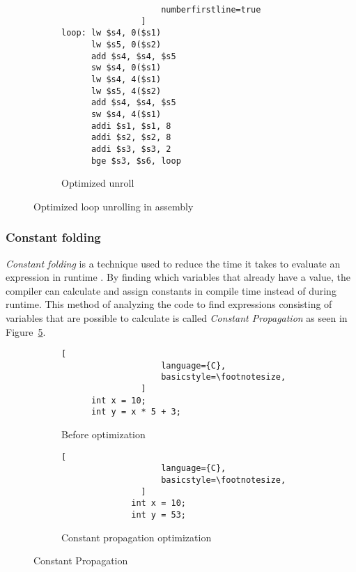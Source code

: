 \begin{figure}[h]
\begin{adjustbox}{minipage=\linewidth,scale=0.8}
\begin{subfigure}{.3\textwidth}
\begin{lstlisting}
                    numberfirstline=true
                ]
loop: lw $s4, 0($s1)
      lw $s5, 0($s2)
      add $s4, $s4, $s5
      sw $s4, 0($s1)
      lw $s4, 4($s1)
      lw $s5, 4($s2)
      add $s4, $s4, $s5
      sw $s4, 4($s1)
      addi $s1, $s1, 8
      addi $s2, $s2, 8
      addi $s3, $s3, 2
      bge $s3, $s6, loop
                \end{lstlisting}
            \caption{Optimized unroll}
            \label{fig:optimized:sub2}
        \end{subfigure}
    \end{adjustbox}
    \caption{Optimized loop unrolling in assembly}
    \label{fig:assembly:optimized}
\end{figure}


\subsubsection{Constant folding}
\emph{Constant folding} is a technique used to reduce the time it takes to evaluate an expression in runtime \cite[p.~329]{muchnick1997advanced}. By finding which variables that already have a value, the compiler can calculate and assign constants in compile time instead of during runtime. This method of analyzing the code to find expressions consisting of variables that are possible to calculate is called \emph{Constant Propagation} as seen in Figure~\ref{fig:constant:propagation}.

\begin{figure}[h]
    \centering
    \begin{adjustbox}{minipage=\linewidth,scale=1.0}
        \begin{subfigure}{.40\textwidth}
            \centering
            \begin{lstlisting}[
                    language={C},
                    basicstyle=\footnotesize,
                ]
      int x = 10;
      int y = x * 5 + 3;
                \end{lstlisting}
            \caption{Before optimization}
            \label{fig:propagation:sub1}
        \end{subfigure}%
        \begin{subfigure}{.50\textwidth}
            \centering
            \begin{lstlisting}[
                    language={C},
                    basicstyle=\footnotesize,
                ]
              int x = 10;
              int y = 53;
                \end{lstlisting}
            \caption{Constant propagation optimization}
            \label{fig:propagation:sub2}
        \end{subfigure}
    \end{adjustbox}
    \caption{Constant Propagation}
    \label{fig:constant:propagation}
\end{figure}

